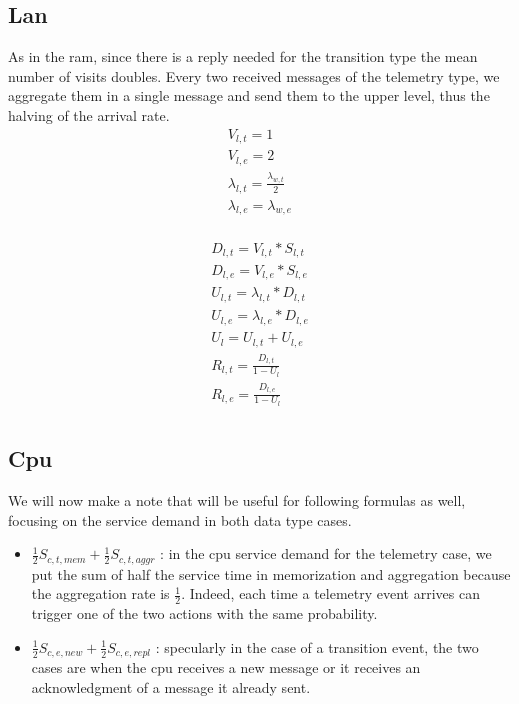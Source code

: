 \documentclass[11pt]{article}
\begin{document}
\subsection{Lan}
As in the ram, since there is a reply needed for the transition type the mean number of visits doubles.
Every two received messages of the telemetry type, we aggregate them in a single message and send them to the upper level, thus the halving of the arrival rate.
\begin{equation}
    \begin{array}{l}
        V_{l, t} = 1 \\
        V_{l, e} = 2 \\ %
        \lambda_{l, t} = \frac{\lambda_{w, t}}{2} \\ %
        \lambda_{l, e} = \lambda_{w, e} \\
    \end{array}
\end{equation}

\begin{equation}
    \begin{array}{l}
        D_{l, t} = V_{l, t} * S_{l, t} \\
        D_{l, e} = V_{l, e} * S_{l, e} \\
        U_{l, t} = \lambda_{l, t} * D_{l, t} \\
        U_{l, e} = \lambda_{l, e} * D_{l, e} \\
        U_{l} = U_{l, t} + U_{l, e} \\
        R_{l, t} = \frac{D_{l, t}}{1 - U_{l}} \\
        R_{l, e} = \frac{D_{l, e}}{1 - U_{l}} \\
    \end{array}
\end{equation}

\subsection{Cpu}
We will now make a note that will be useful for following formulas as well, focusing on the service demand in both data type cases.\\
\begin{itemize}
\item $\frac{1}{2}S_{c, t, mem} + \frac{1}{2}S_{c, t, aggr}$ : in the cpu service demand for the telemetry case, we put the sum of half the service time in memorization and aggregation because the aggregation rate is $\frac{1}{2}$. Indeed, each time a telemetry event arrives can trigger one of the two actions with the same probability.
\item $\frac{1}{2}S_{c, e, new} + \frac{1}{2}S_{c, e, repl}$ : specularly in the case of a transition event, the two cases are when the cpu receives a new message or it receives an acknowledgment of a message it already sent.
\end{itemize}
\end{document}
